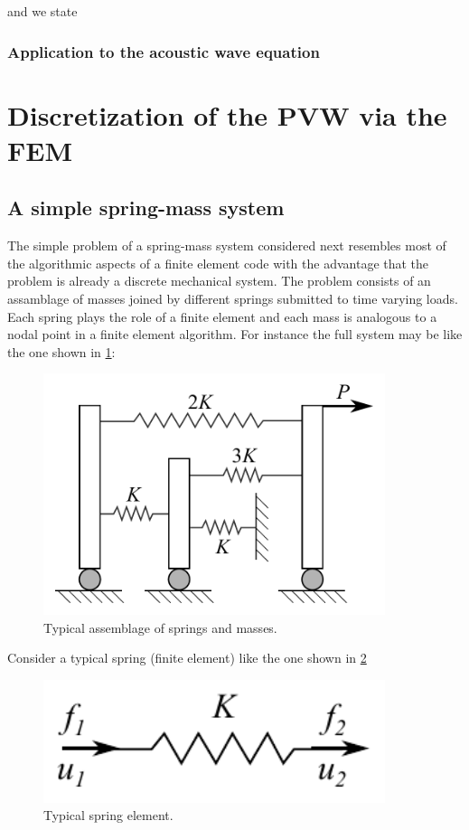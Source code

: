 and we state



\subsubsection*{Application to the acoustic wave equation}

\section[Discretization of the PVW using FEM]{Discretization of the PVW via the FEM}
\subsection*{A simple spring-mass system}
The simple problem of a spring-mass system considered next resembles most of the algorithmic aspects of a finite element code with the advantage that the problem is already a discrete mechanical system. The problem consists of an assamblage of masses joined by different springs submitted to time varying loads. Each spring plays the role of a finite element and each mass is analogous to a nodal point in a finite element algorithm. For instance the full system may be like the one shown in \cref{fig:bathe}:


\begin{figure}[H]
\centering
\includegraphics[width=10cm]{img/spring_system.pdf}
\caption{Typical assemblage of springs and masses.}
\label{fig:bathe}
\end{figure}


Consider a typical spring (finite element) like the one shown in \cref{fig:springel}

\begin{figure}[H]
\centering
\includegraphics[width=10cm]{img/springel.pdf}
\caption{Typical spring element.}
\label{fig:springel}
\end{figure}

